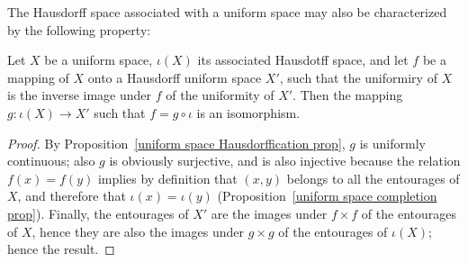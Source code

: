 The Hausdorff space associated with a uniform space may also be characterized by the following property:
\begin{proposition}\label{uniform space Hausdorffication char}
Let $X$ be a uniform space, $\iota(X)$ its associated Hausdotff space, and let $f$ be a mapping of $X$ onto a Hausdorff uniform space $X'$, such that the uniformiry of $X$ is the inverse image under $f$ of the uniformity of $X'$. Then the mapping $g:\iota(X)\to X'$ such that $f=g\circ\iota$ is an isomorphism.
\end{proposition}
\begin{proof}
By Proposition~\ref{uniform space Hausdorffication prop}, $g$ is uniformly continuous; also $g$ is obviously surjective, and is also injective because the relation $f(x)=f(y)$ implies by definition that $(x,y)$ belongs to all the entourages of $X$, and therefore that $\iota(x)=\iota(y)$ (Proposition~\ref{uniform space completion prop}). Finally, the entourages of $X'$ are the images under $f\times f$ of the entourages of $X$, hence they are also the images under $g\times g$ of the entourages of $\iota(X)$; hence the result.
\end{proof}

